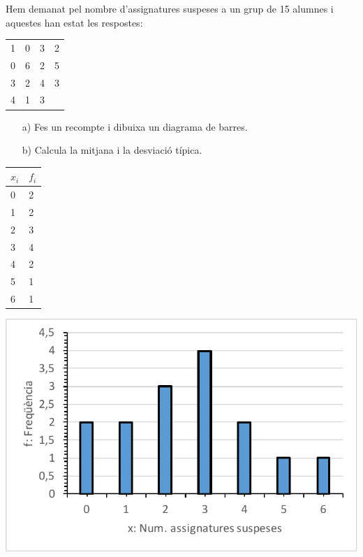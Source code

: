 	\begin{resolt}{Hem demanat pel nombre d'assignatures suspeses a un grup de 15 alumnes i aquestes han estat les respostes:\vspace{0.25cm}
			 \begin{center}
			 \begin{tabular}{cccc}
			 	1 & 0 & 3 & 2 \\
			 	0 & 6 & 2 & 5 \\
			 	3 & 2 & 4 & 3 \\
			 	4 & 1 & 3 & 	
			 \end{tabular}
		\end{center}
		\vspace{0.25cm}
		
			\begin{itemize}
				\item[a)]  Fes un recompte i dibuixa un diagrama de barres.
				
				\item[b)]  Calcula la mitjana i la desviació típica.
			\end{itemize}
		}
		
\begin{center}
\begin{minipage}{0.2\textwidth}
	\centering
	 	\begin{tabular}{|p{0.4in}|p{0.4in}|} \hline 
			$x_i$ & $f_i$ \\ \hline 
			0 & 2\\ \hline 
			1 & 2 \\ \hline 
			2 & 3 \\ \hline 
			3 & 4 \\ \hline 
			4 & 2 \\ \hline 
			5 & 1 \\ \hline 
			6 & 1  \\ \hline
		\end{tabular}
\end{minipage}	
\begin{minipage}{0.4\textwidth} 
	\centering
	\includegraphics[width=\textwidth]{img-04/histo2}
\end{minipage}
\end{center}


\end{resolt}
